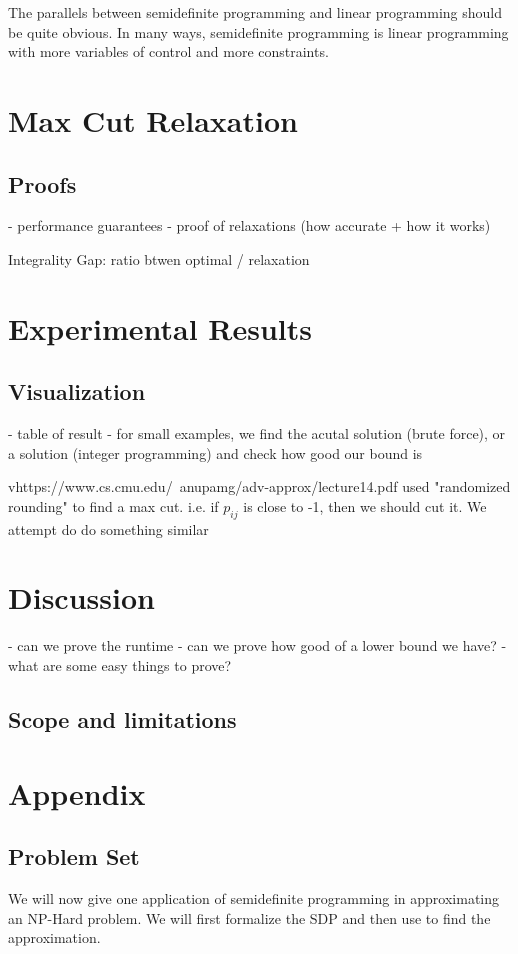 \documentclass{article}
\begin{document}
The parallels between semidefinite programming and linear programming should be quite obvious.
In many ways, semidefinite programming is linear programming with more variables of control and more constraints.


\section{Max Cut Relaxation}   %
\subsection{Proofs}
- performance guarantees
- proof of relaxations (how accurate + how it works)


Integrality Gap: ratio btwen optimal / relaxation 



\section{Experimental Results}
\subsection{Visualization}
- table of result
- for small examples, we find the acutal solution (brute force), or a solution (integer programming) and check how 
good our bound is

vhttps://www.cs.cmu.edu/~anupamg/adv-approx/lecture14.pdf used "randomized rounding" to find a max cut.
i.e. if $p_{ij}$ is close to -1, then we should cut it. We attempt do do something similar

\section{Discussion}


- can we prove the runtime
- can we prove how good of a lower bound we have?
- what are some easy things to prove?

\subsection{Scope and limitations}

\section{Appendix}
\newpage
\subsection{Problem Set}
We will now give one application of semidefinite programming in approximating an NP-Hard problem.
We will first formalize the SDP and then use to find the approximation.
\end{document}
